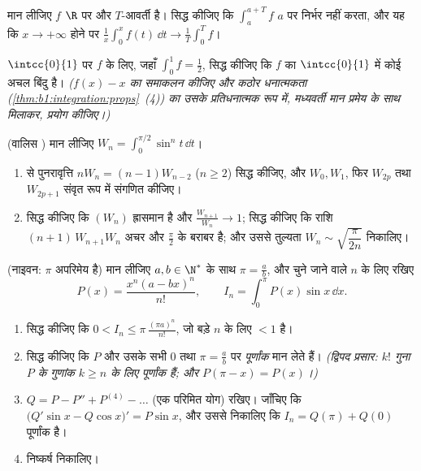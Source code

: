 \begin{exercise}[$\star\star$]\label{exo:b1:integration:6}
मान लीजिए $f$ $\R$ पर  और $T$-आवर्ती है। सिद्ध कीजिए कि $\int_a^{a+T} f$
$a$ पर निर्भर नहीं करता, और यह कि $x \to +\infty$ होने पर $\frac1x \int_0^x
f(t)\,\dd t \to \frac 1T \int_0^T f$।
\end{exercise}

\begin{exercise}[$\star\star$]\label{exo:b1:integration:7}
$\intcc{0}{1}$ पर  $f$ के लिए, जहाँ $\int_0^1 f = \frac12$, सिद्ध कीजिए
कि $f$ का $\intcc{0}{1}$ में कोई अचल बिंदु है। \emph{($f(x) - x$ का समाकलन
कीजिए और कठोर धनात्मकता (\cref{thm:b1:integration:props}~(4)) का उसके
प्रतिधनात्मक रूप में, मध्यवर्ती मान प्रमेय के साथ मिलाकर, प्रयोग कीजिए।)}
\end{exercise}

\begin{exercise}[$\star\star\star$]\label{exo:b1:integration:8}
(वालिस ) मान लीजिए $W_n = \int_0^{\pi/2} \sin^n t\,\dd t$।
\begin{enumerate}
  \item {} से पुनरावृत्ति $n W_n = (n-1) W_{n-2}$ ($n \geq 2$)
  सिद्ध कीजिए, और $W_0, W_1$, फिर $W_{2p}$ तथा $W_{2p+1}$ संवृत रूप में
  संगणित कीजिए।
  \item सिद्ध कीजिए कि $(W_n)$ ह्रासमान है और $\frac{W_{n+1}}{W_n} \to 1$;
  सिद्ध कीजिए कि राशि $(n+1)\,W_{n+1} W_n$ अचर और $\frac\pi2$ के बराबर है;
  और उससे तुल्यता $W_n \sim \sqrt{\dfrac{\pi}{2n}}$ निकालिए।
\end{enumerate}
\end{exercise}

\begin{exercise}[$\star\star\star$]\label{exo:b1:integration:9}
(नाइवन: $\pi$ अपरिमेय है) मान लीजिए $a, b \in \N^*$ के साथ $\pi = \frac ab$,
और चुने जाने वाले $n$ के लिए रखिए
\[
P(x) = \frac{x^n (a - bx)^n}{n!},
\qquad
I_n = \int_0^{\pi} P(x)\sin x\, \dd x .
\]
\begin{enumerate}
  \item सिद्ध कीजिए कि $0 < I_n \leq \pi\,\frac{(\pi a)^n}{n!}$, जो बड़े $n$
  के लिए $< 1$ है।
  \item सिद्ध कीजिए कि $P$ और उसके सभी  $0$ तथा $\pi = \frac ab$ पर
  \emph{पूर्णांक} मान लेते हैं। \emph{(द्विपद प्रसार: $k!$ गुना $P$ के
  गुणांक $k \geq n$ के लिए पूर्णांक हैं; और $P(\pi - x) = P(x)$।)}
  \item $Q = P - P'' + P^{(4)} - \dots$ (एक परिमित योग) रखिए। जाँचिए कि
  $\bigl(Q'\sin x - Q\cos x\bigr)' = P \sin x$, और उससे निकालिए कि $I_n =
  Q(\pi) + Q(0)$ पूर्णांक है।
  \item निष्कर्ष निकालिए।
\end{enumerate}
\end{exercise}

